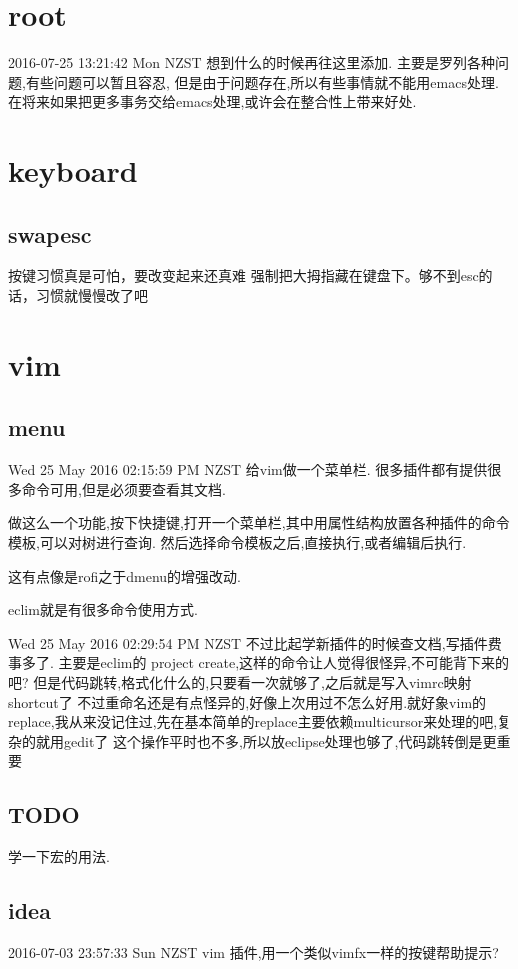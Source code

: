 \documentclass[12pt,a4paper]{article}
\date{\today}
\title{}
\begin{document}
\tableofcontents

\section{root}
\label{sec:orgheadline1}
2016-07-25 13:21:42 Mon NZST
  想到什么的时候再往这里添加.
主要是罗列各种问题,有些问题可以暂且容忍,
但是由于问题存在,所以有些事情就不能用emacs处理.
在将来如果把更多事务交给emacs处理,或许会在整合性上带来好处.
\section{keyboard}
\label{sec:orgheadline3}
\subsection{swapesc}
\label{sec:orgheadline2}
按键习惯真是可怕，要改变起来还真难
强制把大拇指藏在键盘下。够不到esc的话，习惯就慢慢改了吧
\section{vim}
\label{sec:orgheadline9}
\subsection{menu}
\label{sec:orgheadline4}
Wed 25 May 2016 02:15:59 PM NZST
给vim做一个菜单栏.
很多插件都有提供很多命令可用,但是必须要查看其文档.

做这么一个功能,按下快捷键,打开一个菜单栏,其中用属性结构放置各种插件的命令模板,可以对树进行查询.
然后选择命令模板之后,直接执行,或者编辑后执行.

这有点像是rofi之于dmenu的增强改动. 

eclim就是有很多命令使用方式.

Wed 25 May 2016 02:29:54 PM NZST
不过比起学新插件的时候查文档,写插件费事多了.
主要是eclim的 project create,这样的命令让人觉得很怪异,不可能背下来的吧?
但是代码跳转,格式化什么的,只要看一次就够了,之后就是写入vimrc映射shortcut了
不过重命名还是有点怪异的,好像上次用过不怎么好用.就好象vim的replace,我从来没记住过,先在基本简单的replace主要依赖multicursor来处理的吧,复杂的就用gedit了
这个操作平时也不多,所以放eclipse处理也够了,代码跳转倒是更重要
\subsection{{\bfseries\sffamily TODO} }
\label{sec:orgheadline5}
学一下宏的用法.
\subsection{idea}
\label{sec:orgheadline6}
2016-07-03 23:57:33 Sun NZST
vim 插件,用一个类似vimfx一样的按键帮助提示?
\end{document}
